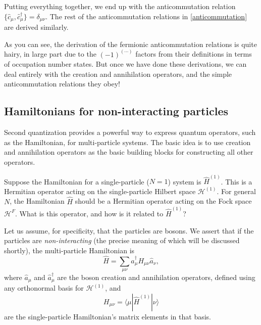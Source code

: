 \documentclass[prx,12pt]{revtex4-2}
\begin{document}
Putting everything together, we end up with the anticommutation
relation $\{ \hat{c}_\mu, \hat{c}_\mu^\dagger\} = \delta_{\mu\nu}$.
The rest of the anticommutation relations in \eqref{anticommutation}
are derived similarly.

As you can see, the derivation of the fermionic anticommutation
relations is quite hairy, in large part due to the $(-1)^{(\cdots)}$
factors from their definitions in terms of occupation number states.
But once we have done these derivations, we can deal entirely with the
creation and annihilation operators, and the simple anticommutation
relations they obey!

\subsection{Hamiltonians for non-interacting particles}
\label{sec:second_quant_op}

Second quantization provides a powerful way to express quantum
operators, such as the Hamiltonian, for multi-particle systems.  The
basic idea is to use creation and annihilation operators as the basic
building blocks for constructing all other operators.

Suppose the Hamiltonian for a single-particle ($N=1$) system is
$\hat{H}^{(1)}$.  This is a Hermitian operator acting on the
single-particle Hilbert space $\mathscr{H}^{(1)}$.  For general $N$,
the Hamiltonian $\hat{H}$ should be a Hermitian operator acting on the
Fock space $\mathscr{H}^F$.  What is this operator, and how is it
related to $\hat{H}^{(1)}$?

Let us assume, for specificity, that the particles are bosons.  We
assert that if the particles are \textit{non-interacting} (the precise
meaning of which will be discussed shortly), the multi-particle
Hamiltonian is
\begin{equation}
  \hat{H} = \sum_{\mu\nu} \hat{a}^\dagger_\mu H_{\mu\nu} \hat{a}_\nu,
  \label{twobosonH}
\end{equation}
where $\hat{a}_\mu$ and $\hat{a}_\mu^\dagger$ are the boson creation
and annihilation operators, defined using any orthonormal basis for
$\mathscr{H}^{(1)}$, and
\begin{equation}
  H_{\mu\nu} = \langle\mu|\hat{H}^{(1)}|\nu\rangle
  \label{Hmunu}
\end{equation}
are the single-particle Hamiltonian's matrix elements in that basis.
\end{document}
